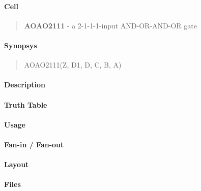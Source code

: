\label{AOAO2111}
\paragraph{Cell}
\begin{quote}
    \textbf{AOAO2111} - a 2-1-1-1-input AND-OR-AND-OR gate
\end{quote}

\paragraph{Synopsys}
\begin{quote}
    AOAO2111(Z, D1, D, C, B, A)
\end{quote}

\paragraph{Description}

%

\paragraph{Truth Table}
%

\paragraph{Usage}

\paragraph{Fan-in / Fan-out}

\paragraph{Layout}

\paragraph{Files}
